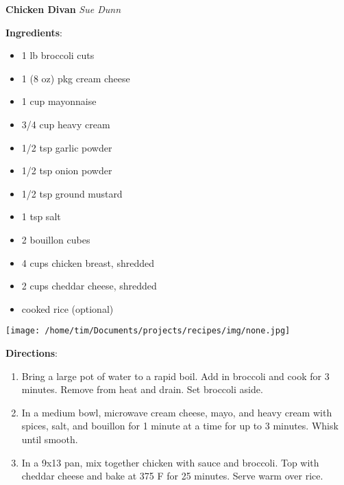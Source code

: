 \documentclass[11pt, twoside, openany]{book}
\begin{document}
\noindent\begin{minipage}[t]{\linewidth}%
{\Large\textbf{Chicken Divan}} \label{chicken-divan}\hfill\textit{Sue Dunn}\\
\noindent\begin{minipage}[t]{0.78\linewidth}%
\textbf{Ingredients}:\vspace{-3mm}
\begin{multicols}{2}
\begin{itemize}\setlength\itemsep{-1mm}
\item 1 lb broccoli cuts
\item 1 (8 oz) pkg cream cheese
\item 1 cup mayonnaise
\item 3/4 cup heavy cream
\item 1/2 tsp garlic powder
\item 1/2 tsp onion powder
\item 1/2 tsp ground mustard
\item 1 tsp salt
\item 2 bouillon cubes
\item 4 cups chicken breast, shredded
\item 2 cups cheddar cheese, shredded
\item cooked rice (optional)
\end{itemize}
\end{multicols}
\end{minipage}
\noindent\begin{minipage}[t]{0.18\linewidth}
\centering \strut\vspace*{-\baselineskip}\newline
\texttt{[image: /home/tim/Documents/projects/recipes/img/none.jpg]}\\
\end{minipage}\vspace{3mm}
\textbf{Directions}:
\vspace{-3mm}\begin{enumerate}\setlength\itemsep{-1mm}
\item Bring a large pot of water to a rapid boil. Add in broccoli and cook for 3 minutes. Remove from heat and drain. Set broccoli aside.
\item In a medium bowl, microwave cream cheese, mayo, and heavy cream with spices, salt, and bouillon for 1 minute at a time for up to 3 minutes. Whisk until smooth.
\item In a 9x13 pan, mix together chicken with sauce and broccoli. Top with cheddar cheese and bake at 375 F for 25 minutes. Serve warm over rice.
\end{enumerate}
\end{minipage}\vspace{8mm}
\end{document}

